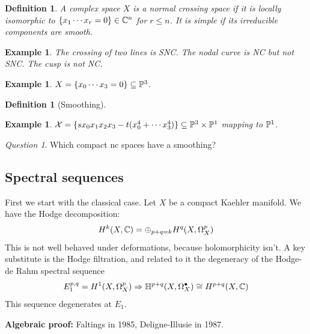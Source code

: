 \documentclass[A4paper, british, reqno]{amsart}
\theoremstyle{darkgreentheorem}
\theoremstyle{darkbluedefinition}
\newtheorem{defn}[thm]{Definition}
\theoremstyle{darkredexample}
\newtheorem{exa}[thm]{Example}
\theoremstyle{remark}
\newtheorem{q}[thm]{Question}
\newcommand{\1}{\mathbbm{1}}
\newcommand{\op}{\oplus}
\newcommand{\grd}{^{\bullet}}
\newcommand{\sub}{\subseteq}
\begin{document}
\begin{defn}
    A complex space $X$ is a \textit{normal crossing} space if it is locally isomorphic to $\{x_{1}\cdots x_{r}=0\}\in \C^{n}$ for $r\leqslant n$.
    It is \textit{simple} if its irreducible components are smooth.
\end{defn}

\begin{exa}
    The crossing of two lines is SNC.
    The nodal curve is NC but not SNC.
    The cusp is not NC.
\end{exa}

\begin{exa}
    $X=\{x_{0}\cdots x_{3}=0\}\sub \P^{3}$.
\end{exa}

\begin{defn}[Smoothing]
    \begin{center}
    \end{center}
\end{defn}

\begin{exa}
    $\X=\{sx_{0}x_{1}x_{2}x_{3}-t(x_{0}^{4}+\cdots x_{3}^{4}) \}\sub \P^{3}\times \P^{1}$ mapping to $\P^{1}$.
\end{exa}

\begin{q}
    Which compact nc spaces have a smoothing?
\end{q}

\subsection{Spectral sequences}

First we start with the classical case.
Let $X$ be a compact Kaehler manifold.
We have the Hodge decomposition:
\[ H^{k}(X,\C)=\op_{p+q=k}H^{q}(X,\Omega_{X}^{p}) \]
This is not well behaved under deformations, because holomorphicity isn't.
A key substitute is the Hodge filtration, and related to it the degeneracy of the Hodge-de Rahm spectral sequence
\[ E_{1}^{p,q}=H^{1}(X,\Omega_{X}^{p})\Rightarrow \bbH^{p+q}(X,\Omega_{X}\grd)\cong H^{p+q}(X,\C) \]
This sequence degenerates at $E_{1}$.

\textbf{Algebraic proof:} Faltings in 1985, Deligne-Illusie in 1987.
\end{document}
